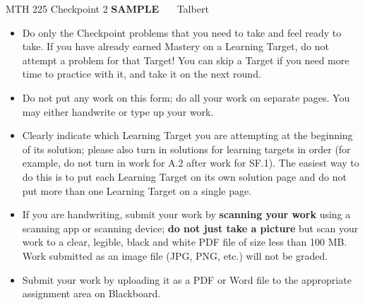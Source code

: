 \documentclass[11 pt]{article}
\begin{document}
\noindent MTH 225 Checkpoint 2 \textbf{SAMPLE} \ \ \  \hfill Talbert \\


\begin{itemize}
    \item Do only the Checkpoint problems that you need to take and feel ready to take. If you have already earned Mastery on a Learning Target, do not attempt a problem for that Target! You can skip a Target if you need more time to practice with it, and take it on the next round. 
    \item Do not put any work on this form; do all your work on separate pages. You may either handwrite or type up your work. 
    \item Clearly indicate which Learning Target you are attempting at the beginning of its solution; please also turn in solutions for learning targets in order (for example, do not turn in work for A.2 after work for SF.1). The easiest way to do this is to put each Learning Target on its own solution page and do not put more than one Learning Target on a single page. 
    \item If you are handwriting, submit your work by \textbf{scanning your work} using a scanning app or scanning device; \textbf{do not just take a picture} but scan your work to a clear, legible, black and white PDF file of size less than 100 MB. Work submitted as an image file (JPG, PNG, etc.) will not be graded. 
    \item Submit your work by uploading it as a PDF or Word file to the appropriate assignment area on Blackboard.  
\end{itemize}



\noindent \hrulefill
\end{document}
